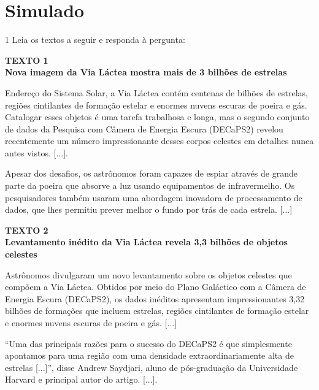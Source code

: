 \chapter[Simulado4]{Simulado}

\vspace*{-.5cm}

\num{1} Leia os textos a seguir e responda à pergunta:

\begin{myquote}
\textbf{TEXTO 1}\\
\textbf{Nova imagem da Via Láctea mostra mais de 3 bilhões de
estrelas}

Endereço do Sistema Solar, a Via Láctea contém centenas de bilhões de
estrelas, regiões cintilantes de formação estelar e enormes nuvens
escuras de poeira e gás. Catalogar esses objetos é uma tarefa trabalhosa
e longa, mas o segundo conjunto de dados da Pesquisa com Câmera de
Energia Escura (DECaPS2) revelou recentemente um número impressionante
desses corpos celestes em detalhes nunca antes vistos. {[}...{]}.

Apesar dos desafios, os astrônomos foram capazes de espiar através de
grande parte da poeira que absorve a luz usando equipamentos de
infravermelho. Os pesquisadores também usaram uma abordagem inovadora de
processamento de dados, que lhes permitiu prever melhor o fundo por trás
de cada estrela.
{[}...{]}


\noindent\textbf{TEXTO 2}\\
\textbf{Levantamento inédito da Via Láctea revela 3,3 bilhões
de objetos celestes}

Astrônomos divulgaram um novo levantamento sobre os objetos celestes
que compõem a Via Láctea. Obtidos por meio do Plano Galáctico com a
Câmera de Energia Escura (DECaPS2), os dados inéditos apresentam
impressionantes 3,32 bilhões de formações que incluem estrelas, regiões
cintilantes de formação estelar e enormes nuvens escuras de poeira e
gás.
{[}...{]}

“Uma das principais razões para o sucesso do DECaPS2 é que simplesmente
apontamos para uma região com uma densidade extraordinariamente alta de
estrelas {[}...{]}”, disse Andrew Saydjari, aluno de pós-graduação da
Universidade Harvard e principal autor do artigo.
{[}...{]}.

\end{myquote}

